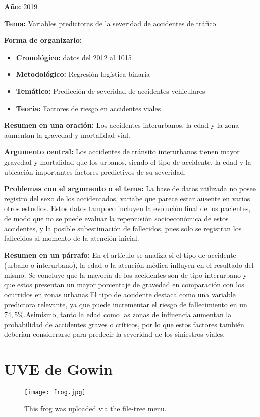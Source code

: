\documentclass{book}
\begin{document}
\textbf{Año:} 2019

\textbf{Tema:} Variables predictoras de la severidad de accidentes de tráfico

\textbf{Forma de organizarlo:}

\begin{itemize}
\setlength{\itemindent}{0.5in}
    \item \textbf{Cronológico:} datos del 2012 al 1015
    \item \textbf{Metodológico:} Regresión logística binaria
    \item \textbf{Temático:} Predicción de severidad de accidentes vehiculares
    \item \textbf{Teoría:} Factores de riesgo en accidentes viales
\end{itemize}

\textbf{Resumen en una oración:} Los accidentes interurbanos, la edad y la zona aumentan la gravedad y mortalidad vial.

\textbf{Argumento central:} Los accidentes de tránsito interurbanos tienen mayor gravedad y mortalidad que los urbanos, siendo el tipo de accidente, la edad y la ubicación importantes factores predictivos de su severidad.

\textbf{Problemas con el argumento o el tema:} La base de datos utilizada no posee registro del sexo de los accidentados, variabe que parece estar ausente en varios otros estudios. Estos datos tampoco incluyen la evolución final de los pacientes, de modo que no se puede evaluar la repercusión socioeconómica de estos accidentes, y la posible subestimación de fallecidos, pues solo se registran los fallecidos al momento de la atención inicial.

\textbf{Resumen en un párrafo:} En el artículo se analiza si el tipo de accidente (urbano o interurbano), la edad o la atención médica influyen en el resultado del mismo. Se concluye que la mayoría de los accidentes son de tipo interurbano y que estos presentan un mayor porcentaje de gravedad en comparación con los ocurridos en zonas urbanas.El tipo de accidente destaca como una variable predictora relevante, ya que puede incrementar el riesgo de fallecimiento en un $74,5\%$.Asimismo, tanto la edad como las zonas de influencia aumentan la probabilidad de accidentes graves o críticos, por lo que estos factores también deberían considerarse para predecir la severidad de los siniestros viales.

\section{UVE de Gowin}

\begin{figure}
\centering
\texttt{[image: frog.jpg]}
\caption{\label{fig:frog}This frog was uploaded via the file-tree menu.}
\end{figure}



\nocite{*}
\end{document}
